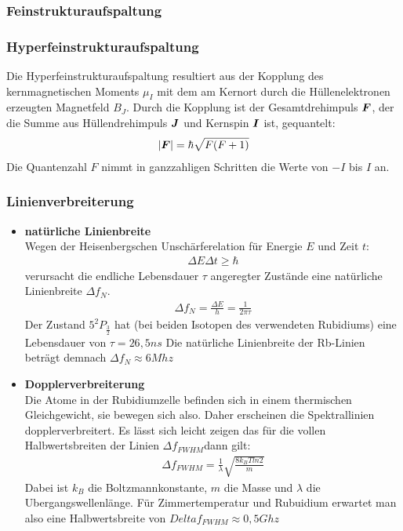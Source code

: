 \documentclass[12pt]{article}
\renewcommand*\vec[1]{{\mbox{\boldmath\ensuremath{#1}}}}
\begin{document}
\subsubsection{Feinstrukturaufspaltung}

\subsubsection{Hyperfeinstrukturaufspaltung}
Die Hyperfeinstrukturaufspaltung resultiert aus der Kopplung des kernmagnetischen Moments $\mu_I$ mit dem am Kernort durch die Hüllenelektronen erzeugten Magnetfeld $B_J$.
Durch die Kopplung ist der Gesamtdrehimpuls $\vec{F}$, der die Summe aus Hüllendrehimpuls $\vec{J}$ und Kernspin $\vec{I}$ ist, gequantelt:
\begin{align*}
 \left|\vec{F}\right| = \hbar \sqrt{F(F+1)}
\end{align*}
Die Quantenzahl $F$ nimmt in ganzzahligen Schritten die Werte von $-I$ bis $I$ an.
\subsubsection{Linienverbreiterung}
\begin{itemize}
 \item \textbf{natürliche Linienbreite} \\
    Wegen der Heisenbergschen Unschärferelation für Energie $E$ und Zeit $t$:
    \begin{align*}
    \Delta E \Delta t \geq \hbar
    \end{align*}
    verursacht die endliche Lebensdauer $\tau$ angeregter Zustände eine natürliche Linienbreite $\Delta f_N$.
    \begin{align}
    \label{natbreite}
    \Delta f_N  = \frac{\Delta E}{h} = \frac{1}{2 \pi \tau}
    \end{align}
    Der Zustand $5^2P_{\frac{3}{2}}$ hat (bei beiden Isotopen des verwendeten Rubidiums) eine Lebensdauer von $\tau =26,5 ns$
    Die natürliche Linienbreite der Rb-Linien beträgt demnach $\Delta f_N \approx 6 Mhz$
 \item \textbf{Dopplerverbreiterung} \\
    Die Atome in der Rubidiumzelle befinden sich in einem thermischen Gleichgewicht, sie bewegen sich also. Daher erscheinen die Spektrallinien dopplerverbreitert. Es lässt sich leicht zeigen das für die vollen Halbwertsbreiten der Linien $\Delta f_{FWHM}$dann gilt:
    \begin{align}
    \label{FWHM}
     \Delta f_{FWHM} = \frac{1}{\lambda} \sqrt{\frac{8 k_B T ln 2}{m}}
    \end{align}
    Dabei ist $k_B$ die Boltzmannkonstante, $m$ die Masse und $\lambda$ die Ubergangswellenlänge.
Für Zimmertemperatur und Rubuidium erwartet man also eine Halbwertsbreite von $Delta f_{FWHM} \approx 0,5 Ghz$
\end{itemize}
\end{document}
